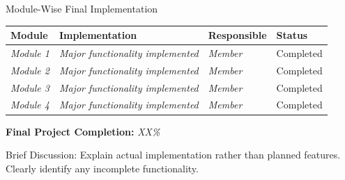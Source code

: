 \documentclass[aspectratio=169,11pt]{beamer}
\newcommand{\smallnote}[1]{%
\vspace{0.08cm}
{\scriptsize\color{GEUGrey}#1}
}
\newcommand{\placeholder}[1]{%
\textit{\color{GEUGrey}#1}
}
\begin{document}
\begin{frame}{Module-Wise Final Implementation}

\scriptsize

\begin{center}

\renewcommand{\arraystretch}{1.35}

\begin{tabularx}{.96\textwidth}
{@{}p{2.4cm}X p{2.0cm}p{2.0cm}@{}}

\toprule
\textbf{Module} &
\textbf{Implementation} &
\textbf{Responsible} &
\textbf{Status}\\
\midrule

\placeholder{Module 1} &
\placeholder{Major functionality implemented} &
\placeholder{Member} &
Completed\\

\placeholder{Module 2} &
\placeholder{Major functionality implemented} &
\placeholder{Member} &
Completed\\

\placeholder{Module 3} &
\placeholder{Major functionality implemented} &
\placeholder{Member} &
Completed\\

\placeholder{Module 4} &
\placeholder{Major functionality implemented} &
\placeholder{Member} &
Completed\\

\bottomrule

\end{tabularx}

\end{center}

\vspace{4mm}

\begin{center}
\colorbox{GEULightBlue}{
\parbox{.65\textwidth}{
\centering
\textbf{Final Project Completion:}
\placeholder{XX\%}
}}
\end{center}

\vfill

\smallnote{
Brief Discussion: Explain actual implementation rather than planned
features. Clearly identify any incomplete functionality.
}

\end{frame}
\end{document}
